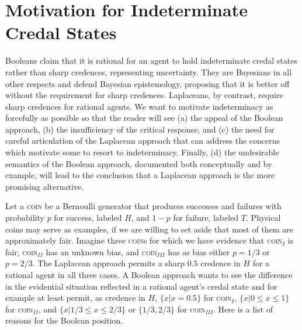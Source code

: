 \documentclass[11pt]{article}
\begin{document}
\section{Motivation for Indeterminate Credal States} 
\label{MotivationForIndeterminateCredalStates}

Booleans claim that it is rational for an agent to hold indeterminate
credal states rather than sharp credences, representing uncertainty.
They are Bayesians in all other respects and defend Bayesian
epistemology, proposing that it is better off without the requirement
for sharp credences. Laplaceans, by contrast, require sharp credences
for rational agents. We want to motivate indeterminacy as forcefully
as possible so that the reader will see (a) the appeal of the Boolean
approach, (b) the insufficiency of the critical response, and (c) the
need for careful articulation of the Laplacean approach that can
address the concerns which motivate some to resort to indeterminacy.
Finally, (d) the undesirable semantics of the Boolean approach,
documented both conceptually and by example, will lead to the
conclusion that a Laplacean approach is the more promising
alternative.

Let a \textsc{coin} be a Bernoulli generator that produces successes
and failures with probability $p$ for success, labeled $H$, and $1-p$
for failure, labeled $T$. Physical coins may serve as examples, if we
are willing to set aside that most of them are approximately fair.
Imagine three \textsc{coin}s for which we have evidence that
\textsc{coin}$_{I}$ is fair, \textsc{coin}$_{II}$ has an unknown bias,
and \textsc{coin}$_{III}$ has as bias either $p=1/3$ or $p=2/3$. The
Laplacean approach permits a sharp $0.5$ credence in $H$ for a
rational agent in all three cases. A Boolean approach wants to see the
difference in the evidential situation reflected in a rational agent's
credal state and for example at least permit, as credence in $H$,
$\{x|x=0.5\}$ for \textsc{coin}$_{I}$, $\{x|0\leq{}x\leq{}1\}$ for
\textsc{coin}$_{II}$, and $\{x|1/3\leq{}x\leq{}2/3\}$ or $\{1/3,2/3\}$
for \textsc{coin}$_{III}$. Here is a list of reasons for the Boolean
position.
\end{document}
